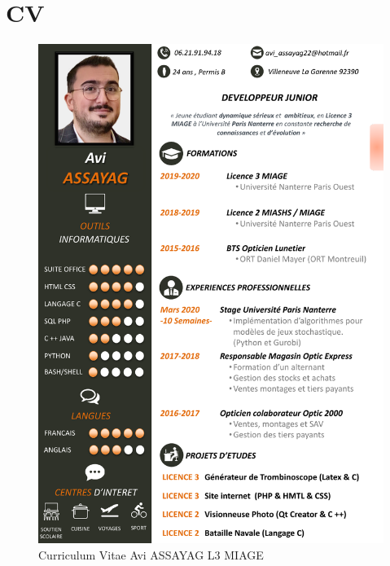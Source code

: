 \documentclass[a4paper, 12pt, twoside]{article}
\begin{document}
\section{ CV}
	\begin{figure}[h!]
	\centering
	\includegraphics [scale=0.83]{CV.pdf}
	\caption{Curriculum Vitae Avi ASSAYAG L3 MIAGE}
	\end{figure}
	
\end{document}
